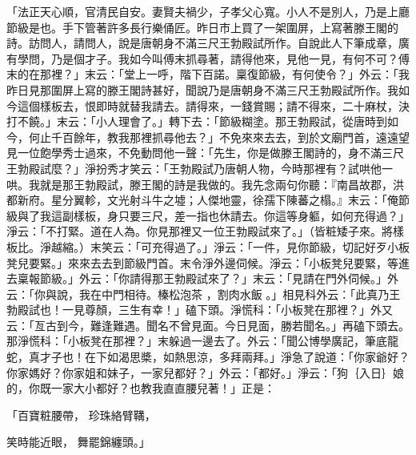「法正天心順，官清民自安。妻賢夫禍少，子孝父心寬。小人不是別人，乃是上廳節級是也。手下管著許多長行樂俑匠。昨日市上買了一架圍屏，上寫著滕王閣的詩。訪問人，請問人，說是唐朝身不滿三尺王勃殿試所作。自說此人下筆成章，廣有學問，乃是個才子。我如今叫傅末抓尋著，請得他來，見他一見，有何不可？傅末的在那裡？」末云：「堂上一呼，階下百諾。稟復節級，有何使令？」外云：「我昨日見那圍屏上寫的滕王閣詩甚好，聞說乃是唐朝身不滿三尺王勃殿試所作。我如今這個樣板去，恨即時就替我請去。請得來，一錢賞賜；請不得來，二十麻杖，決打不饒。」末云：「小人理會了。」轉下去：「節級糊塗。那王勃殿試，從唐時到如今，何止千百餘年，教我那裡抓尋他去？」不免來來去去，到於文廟門首，遠遠望見一位飽學秀士過來，不免動問他一聲：「先生，你是做滕王閣詩的，身不滿三尺王勃殿試麼？」淨扮秀才笑云：「王勃殿試乃唐朝人物，今時那裡有？試哄他一哄。我就是那王勃殿試，滕王閣的詩是我做的。我先念兩句你聽：『南昌故郡，洪都新府。星分翼軫，文光射斗牛之墟；人傑地靈，徐孺下陳蕃之榻。』末云：「俺節級與了我這副樣板，身只要三尺，差一指也休請去。你這等身軀，如何充得過？」淨云：「不打緊。道在人為。你見那裡又一位王勃殿試來了。」（皆粧矮子來。將樣板比。淨越縮。）末笑云：「可充得過了。」淨云：「一件，見你節級，切記好歹小板凳兒要緊。」來來去去到節級門首。末令淨外邊伺候。淨云：「小板凳兒要緊，等進去稟報節級。」外云：「你請得那王勃殿試來了？」末云：「見請在門外伺候。」外云：「你與說，我在中門相待。榛松泡茶 ，割肉水飯 。」相見科外云：「此真乃王勃殿試也！一見尊顏，三生有幸！」磕下頭。淨慌科：「小板凳在那裡？」外又云：「亙古到今，難逢難遇。聞名不曾見面。今日見面，勝若聞名。」再磕下頭去。那淨慌科：「小板凳在那裡？」末躲過一邊去了。外云：「聞公博學廣記，筆底龍蛇，真才子也！在下如渴思槳，如熱思涼，多拜兩拜。」淨急了說道：「你家爺好？你家媽好？你家姐和妹子，一家兒都好？」外云：「都好。」淨云：「狗｛入日｝娘的，你既一家大小都好？也教我直直腰兒著！」正是：

「百寶粧腰帶，  珍珠絡臂鞲，

笑時能近眼，  舞罷錦纏頭。」

